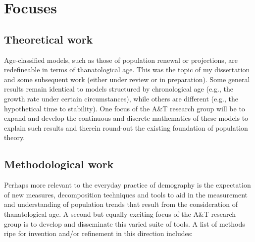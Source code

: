 \documentclass[a4paper,12pt]{article}
\begin{document}
\section{Focuses}
\subsection{Theoretical work}
Age-classified models, such as those of population renewal or projections, are
redefineable in terms of thanatological age. This was the topic of my
dissertation and some subsequent work (either under review or in preparation).
Some general results remain identical to models structured by chronological age (e.g., the growth rate under certain
circumstances), while others are different (e.g., the hypothetical time to
stability). One focus of the A\&T research group will be to
expand and develop the continuous and discrete mathematics of these models to explain such results and therein round-out the existing foundation of population theory.

\subsection{Methodological work}
Perhaps more relevant to the everyday practice of demography is the expectation
of new measures, decomposition techniques and tools to aid in the measurement
and understanding of population trends that result from the consideration of
thanatological age. A second but equally exciting focus of the A\&T research
group is to develop and disseminate this varied suite of tools. A list of
methods ripe for invention and/or refinement in this direction includes:
\end{document}
